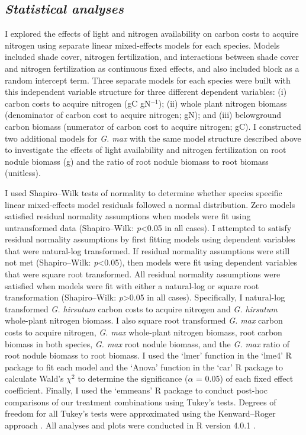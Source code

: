 \subsection{\textit{Statistical analyses}}
\noindent I explored the effects of light and nitrogen availability on carbon costs to acquire nitrogen using separate linear mixed-effects models for each species. Models included shade cover, nitrogen fertilization, and interactions between shade cover and nitrogen fertilization as continuous fixed effects, and also included block as a random intercept term. Three separate models for each species were built with this independent variable structure for three different dependent variables: (i) carbon costs to acquire nitrogen (gC gN$^{-1}$); (ii) whole plant nitrogen biomass (denominator of carbon cost to acquire nitrogen; gN); and (iii) belowground carbon biomass (numerator of carbon cost to acquire nitrogen; gC). I constructed two additional models for \textit{G. max} with the same model structure described above to investigate the effects of light availability and nitrogen fertilization on root nodule biomass (g) and the ratio of root nodule biomass to root biomass (unitless).

I used Shapiro–Wilk tests of normality to determine whether species specific linear mixed-effects model residuals followed a normal distribution. Zero models satisfied residual normality assumptions when models were fit using untransformed data (Shapiro–Wilk: \textit{p}<0.05 in all cases). I attempted to satisfy residual normality assumptions by first fitting models using dependent variables that were natural-log transformed. If residual normality assumptions were still not met (Shapiro–Wilk: \textit{p}<0.05), then models were fit using dependent variables that were square root transformed. All residual normality assumptions were satisfied when models were fit with either a natural-log or square root transformation (Shapiro–Wilk: \textit{p}>0.05 in all cases). Specifically, I natural-log transformed \textit{G. hirsutum} carbon costs to acquire nitrogen and \textit{G. hirsutum} whole-plant nitrogen biomass. I also square root transformed \textit{G. max} carbon costs to acquire nitrogen, \textit{G. max} whole-plant nitrogen biomass, root carbon biomass in both species, \textit{G. max} root nodule biomass, and the \textit{G. max} ratio of root nodule biomass to root biomass. I used the `lmer’ function in the `lme4’ R package  to fit each model and the `Anova’ function in the `car’ R package  to calculate Wald’s $\chi^{2}$ to determine the significance ($\alpha$ = 0.05) of each fixed effect coefficient. Finally, I used the `emmeans’ R package  to conduct post-hoc comparisons of our treatment combinations using Tukey’s tests. Degrees of freedom for all Tukey’s tests were approximated using the Kenward–Roger approach . All analyses and plots were conducted in R version 4.0.1 .

